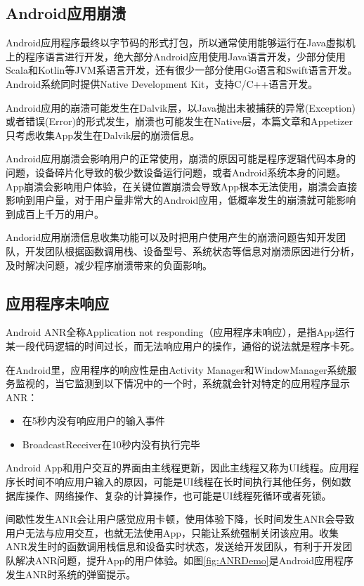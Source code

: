 \subsection{Android应用崩溃}

Android应用程序最终以字节码的形式打包，所以通常使用能够运行在Java虚拟机上的程序语言进行开发，绝大部分Android应用使用Java语言开发，少部分使用Scala和Kotlin等JVM系语言开发，还有很少一部分使用Go语言和Swift语言开发。Android系统同时提供Native Development Kit，支持C/C++语言开发。

Android应用的崩溃可能发生在Dalvik层，以Java抛出未被捕获的异常(Exception)或者错误(Error)的形式发生，崩溃也可能发生在Native层，本篇文章和Appetizer只考虑收集App发生在Dalvik层的崩溃信息。

Android应用崩溃会影响用户的正常使用，崩溃的原因可能是程序逻辑代码本身的问题，设备碎片化导致的极少数设备运行问题，或者Android系统本身的问题。App崩溃会影响用户体验，在关键位置崩溃会导致App根本无法使用，崩溃会直接影响到用户量，对于用户量非常大的Android应用，低概率发生的崩溃就可能影响到成百上千万的用户。

Andorid应用崩溃信息收集功能可以及时把用户使用产生的崩溃问题告知开发团队，开发团队根据函数调用栈、设备型号、系统状态等信息对崩溃原因进行分析，及时解决问题，减少程序崩溃带来的负面影响。

\subsection{应用程序未响应}
\label{subsec:background_ANR}

Android ANR全称Application not responding（应用程序未响应），是指App运行某一段代码逻辑的时间过长，而无法响应用户的操作，通俗的说法就是程序卡死。

在Android里，应用程序的响应性是由Activity Manager和WindowManager系统服务监视的，当它监测到以下情况中的一个时，系统就会针对特定的应用程序显示ANR：

 \begin{itemize}
 	\item 在5秒内没有响应用户的输入事件
 	\item BroadcastReceiver在10秒内没有执行完毕
 \end{itemize}

Android App和用户交互的界面由主线程更新，因此主线程又称为UI线程。应用程序长时间不响应用户输入的原因，可能是UI线程在长时间执行其他任务，例如数据库操作、网络操作、复杂的计算操作，也可能是UI线程死循环或者死锁。

间歇性发生ANR会让用户感觉应用卡顿，使用体验下降，长时间发生ANR会导致用户无法与应用交互，也就无法使用App，只能让系统强制关闭该应用。收集ANR发生时的函数调用栈信息和设备实时状态，发送给开发团队，有利于开发团队解决ANR问题，提升App的用户体验。如图\ref{fig:ANRDemo}是Android应用程序发生ANR时系统的弹窗提示。

